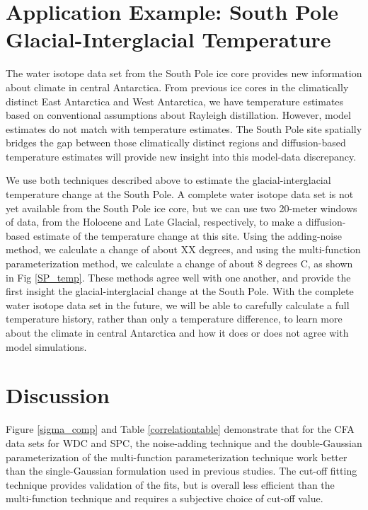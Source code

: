 \documentclass[draft, jgrga]{AGUTeX}
\begin{document}
\begin{article}


\section{Application Example: South Pole Glacial-Interglacial Temperature}

The water isotope data set from the South Pole ice core provides new information about climate in central Antarctica. From previous ice cores in the climatically distinct East Antarctica and West Antarctica, we have temperature estimates based on conventional assumptions about Rayleigh distillation. However, model estimates do not match with temperature estimates. The South Pole site spatially bridges the gap between those climatically distinct regions and diffusion-based temperature estimates will provide new insight into this model-data discrepancy.

We use both techniques described above to estimate the glacial-interglacial temperature change at the South Pole. A complete water isotope data set is not yet available from the South Pole ice core, but we can use two 20-meter windows of data, from the Holocene and Late Glacial, respectively, to make a diffusion-based estimate of the temperature change at this site. Using the adding-noise method, we calculate a change of about XX degrees, and using the multi-function parameterization method, we calculate a change of about 8 degrees C, as shown in Fig \ref{SP_temp}. These methods agree well with one another, and provide the first insight the glacial-interglacial change at the South Pole. With the complete water isotope data set in the future, we will be able to carefully calculate a full temperature history, rather than only a temperature difference, to learn more about the climate in central Antarctica and how it does or does not agree with model simulations.





\section{Discussion}

Figure \ref{sigma_comp} and Table \ref{correlationtable} demonstrate that for the CFA data sets for WDC and SPC, the noise-adding technique and the double-Gaussian parameterization of the multi-function parameterization technique work better than the single-Gaussian formulation used in previous studies. The cut-off fitting technique provides validation of the fits, but is overall less efficient than the multi-function technique and requires a subjective choice of cut-off value.


\end{article}
\end{document}
